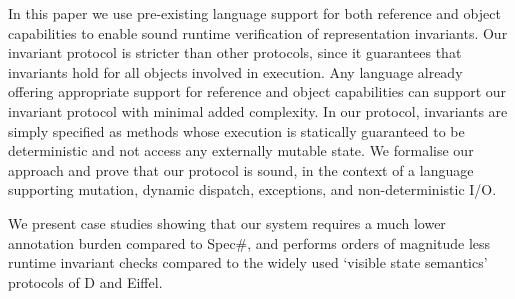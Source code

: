 In this paper we use pre-existing language support for both reference and object capabilities to enable sound runtime verification of representation invariants.
Our invariant protocol is stricter than other  protocols, since it guarantees that invariants hold for all objects involved in execution.
Any language already offering appropriate support for reference and object capabilities can support our invariant protocol with minimal added complexity.
In our protocol, invariants are simply specified as methods whose execution is statically guaranteed to be deterministic and not access any externally mutable state.
We formalise our approach and prove that our protocol is sound, in the context of a language supporting mutation, dynamic dispatch, exceptions, and non-deterministic I/O.

We present case studies showing that our system requires a much lower annotation burden compared to Spec\#, and performs orders of magnitude less runtime invariant checks compared to the widely used `visible state semantics' protocols of D and Eiffel.
